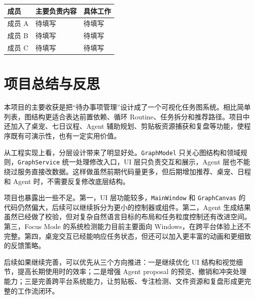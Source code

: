 \documentclass[UTF8,a4paper,12pt,fontset=none]{ctexart}
\begin{document}
\begin{longtable}{|p{3cm}|p{4cm}|p{7cm}|}
\hline
\textbf{成员} & \textbf{主要负责内容} & \textbf{具体工作} \\
\hline
成员 A & 待填写 & 待填写 \\
\hline
成员 B & 待填写 & 待填写 \\
\hline
成员 C & 待填写 & 待填写 \\
\hline
\end{longtable}

\section{项目总结与反思}

本项目的主要收获是把“待办事项管理”设计成了一个可视化任务图系统。相比简单列表，图结构更适合表达前置依赖、循环 Routine、任务拆分和推荐路径。项目中还加入了桌宠、七日议程、Agent 辅助规划、剪贴板资源捕获和复盘等功能，使程序既有可演示性，也有一定实用价值。

从工程实现上看，分层设计带来了明显好处。\texttt{GraphModel} 只关心图结构和领域规则，\texttt{GraphService} 统一处理修改入口，UI 层只负责交互和展示，Agent 层也不能绕过服务直接改数据。这样做虽然前期代码量更多，但后期增加推荐、桌宠、日程和 Agent 时，不需要反复修改底层结构。

项目也暴露出一些不足。第一，UI 层功能较多，\texttt{MainWindow} 和 \texttt{GraphCanvas} 的代码仍然偏大，后续可以继续拆分为更小的控制器或组件。第二，Agent 生成结果虽然已经做了校验，但对复杂自然语言目标的布局和任务粒度控制还有改进空间。第三，Focus Mode 的系统检测能力目前主要面向 Windows，在跨平台体验上还不完整。第四，桌宠交互已经能响应任务状态，但还可以加入更丰富的动画和更细致的反馈策略。

后续如果继续完善，可以优先从三个方向推进：一是继续优化 UI 结构和视觉细节，提高长期使用时的效率；二是增强 Agent proposal 的预览、撤销和冲突处理能力；三是完善跨平台系统能力，让剪贴板、专注检测、文件资源和复盘形成更完整的工作流闭环。
\end{document}
